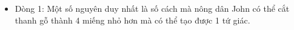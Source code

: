\begin{itemize}
	\item     Dòng 1: Một số nguyên duy nhất là số cách mà nông dân John         có thể cắt thanh gỗ thành 4 miếng nhỏ hơn mà có thể tạo được 1 tứ giác.   
\end{itemize}